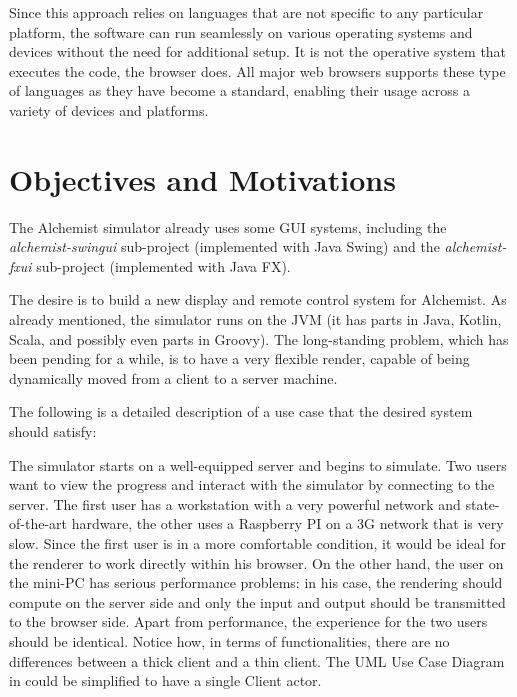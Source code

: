 Since this approach relies on languages that are not specific to any particular platform, the software can run seamlessly on various operating systems and devices without the need for additional setup. It is not the operative system that executes the code, the browser does.
All major web browsers supports these type of languages as they have become a standard, enabling their usage across a variety of devices and platforms.

\section{Objectives and Motivations}
\label{sec:objectives-and-motivations}
The Alchemist simulator already uses some GUI systems, including the \textit{alchemist-swingui} sub-project (implemented with Java Swing) and the \textit{alchemist-fxui} sub-project (implemented with Java FX).\newline

The desire is to build a new display and remote control system for Alchemist. As already mentioned, the simulator runs on the JVM (it has parts in Java, Kotlin, Scala, and possibly even parts in Groovy). The long-standing problem, which has been pending for a while, is to have a very flexible render, capable of being dynamically moved from a client to a server machine.\newline


The following is a detailed description of a use case that the desired system should satisfy:\newline

The simulator starts on a well-equipped server and begins to simulate. Two users want to view the progress and interact with the simulator by connecting to the server. The first user has a workstation with a very powerful network and state-of-the-art hardware, the other uses a Raspberry PI on a 3G network that is very slow. Since the first user is in a more comfortable condition, it would be ideal for the renderer to work directly within his browser. On the other hand, the user on the mini-PC has serious performance problems: in his case, the rendering should compute on the server side and only the input and output should be transmitted to the browser side. Apart from performance, the experience for the two users should be identical. Notice how, in terms of functionalities, there are no differences between a thick client and a thin client. The UML Use Case Diagram in  could be simplified to have a single Client actor.\newline

